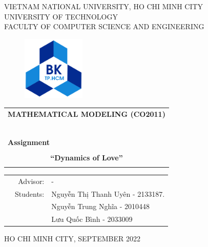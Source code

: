 \documentclass[a4paper]{article}
\begin{document}
    \begin{titlepage}
        \begin{center}
            VIETNAM NATIONAL UNIVERSITY, HO CHI MINH CITY \\
            UNIVERSITY OF TECHNOLOGY \\
            FACULTY OF COMPUTER SCIENCE AND ENGINEERING
        \end{center}
        \vspace{1cm}
        \begin{figure}[h!]
            \begin{center}
                \includegraphics[width=3cm]{hcmut.png}
            \end{center}\label{fig:figure}
        \end{figure}
        \vspace{1cm}
        \begin{center}
            \begin{tabular}{c}
                \multicolumn{1}{l}{\textbf{{\Large MATHEMATICAL MODELING (CO2011)}}}\\
                ~~                                                                               \\
                \hline
                \\
                \multicolumn{1}{l}{\textbf{{\Large Assignment}}}                               \\
                \\
                \textbf{{\Huge “Dynamics of Love”}}\\
                \\
                \hline
            \end{tabular}
        \end{center}
        \vspace{3cm}
        \begin{table}[h]
            \begin{tabular}{rrl}
                \hspace{5 cm} & Advisor:  & -                                      \\
                & Students: & Nguyễn Thị Thanh Uyên - 2133187. \\
                &           & Nguyễn Trung Nghĩa - 2010448 \\
                &           & Lưu Quốc Bình - 2033009 \\
            \end{tabular}\label{tab:table}
        \end{table}
        \begin{center}
        {\footnotesize HO CHI MINH CITY, SEPTEMBER 2022}
        \end{center}
    \end{titlepage}
    \newpage
    \tableofcontents
    \newpage
\end{document}
